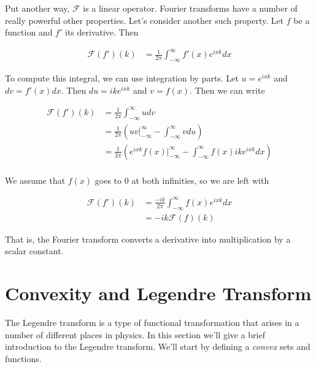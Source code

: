 \documentclass[book.tex]{subfiles}
\begin{document}
Put another way, $\mathcal{F}$ is a linear operator. Fourier transforms have a number of really powerful other properties. Let's consider another such property. Let $f$ be a function and $f'$ its derivative. Then

\begin{align}
    \mathcal{F}(f')(k) &= \frac{1}{2\pi} \int_{-\infty}^{\infty} f'(x)e^{ixk} dx
\end{align}

To compute this integral, we can use integration by parts. Let $u = e^{ixk}$ and $dv = f'(x)dx$. Then $du = ik e^{ixk}$ and $v = f(x)$. Then we can write

\begin{align}
    \mathcal{F}(f')(k) &= \frac{1}{2\pi}\int_{-\infty}^{\infty} u dv \\
    &= \frac{1}{2\pi} \left (uv \Big |^{\infty}_{-\infty} - \int_{-\infty}^{\infty} v du \right ) \\
    &= \frac{1}{2\pi} \left (e^{ixk} f(x) \Big |^{\infty}_{-\infty} - \int_{-\infty}^{\infty} f(x) ike^{ixk} dx \right ) \\
\end{align}

We assume that $f(x)$ goes to 0 at both infinities, so we are left with

\begin{align}
\mathcal{F}(f')(k) &= \frac{-ik}{2\pi} \int_{-\infty}^{\infty} f(x) e^{ixk} dx \\
&= -ik \mathcal{F}(f)(k)
\end{align}

That is, the Fourier transform converts a derivative into multiplication by a scalar constant.%





\section{Convexity and Legendre Transform}

The Legendre transform is a type of functional transformation that arises in a number of different places in physics. In this section we'll give a brief introduction to the Legendre transform. We'll start by defining a \textit{convex} sets and functions.
\end{document}
